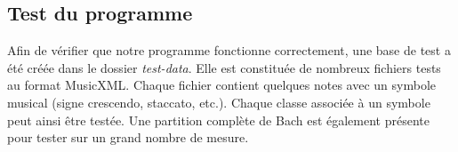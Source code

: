 \subsection{Test du programme}

Afin de vérifier que notre programme fonctionne correctement, une base de test a été créée dans le dossier \emph{test-data}. Elle est constituée de nombreux fichiers tests au format MusicXML. Chaque fichier contient quelques notes avec un symbole musical (signe crescendo, staccato, etc.). Chaque classe associée à un symbole peut ainsi être testée. Une partition complète de Bach est également présente pour tester sur un grand nombre de mesure.
